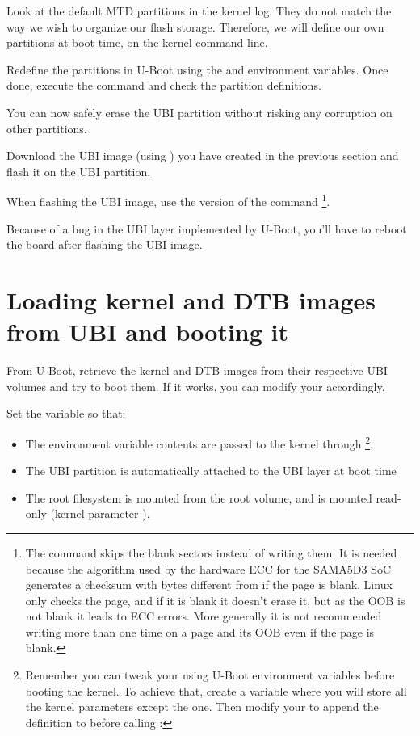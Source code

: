 Look at the default MTD partitions in the kernel log. They do not
match the way we wish to organize our flash
storage. Therefore, we will define our own partitions at boot time,
on the kernel command line.

Redefine the partitions in U-Boot using the  and
 environment variables.
Once done, execute the  command and check the partition
definitions.

You can now safely erase the UBI partition without risking any
corruption on other partitions.

Download the UBI image (using ) you have created in the
previous section and flash it on the UBI partition.

When flashing the UBI image, use the  version of the
command \footnote{The command  skips
  the blank sectors instead of writing them. It is needed because the
  algorithm used by the hardware ECC for the SAMA5D3 SoC generates a
  checksum with bytes different from  if the page is blank. Linux
  only checks the page, and if it is blank it doesn't erase it, but as
  the OOB is not blank it leads to ECC errors. More generally it is
  not recommended writing more than one time on a page and its OOB
  even if the page is blank.}.

Because of a bug in the UBI layer implemented by U-Boot, you'll have
to reboot the board after flashing the UBI image.

\section{Loading kernel and DTB images from UBI and booting it}

From U-Boot, retrieve the kernel and DTB images from their respective
UBI volumes and try to boot them. If it works, you can modify your
 accordingly.

Set the  variable so that:

\begin{itemize}
\item The  environment variable contents are passed to
  the kernel through \footnote{Remember you can tweak your
   using U-Boot environment variables before booting the kernel.
  To achieve that, create a  variable where you
  will store all the kernel parameters except the 
  one. Then modify your  to append the 
  definition to  before calling :
  }.
\item The UBI partition is automatically attached to the UBI layer at
  boot time
\item The root filesystem is mounted from the root volume, and is mounted
  read-only (kernel parameter ).
\end{itemize}

